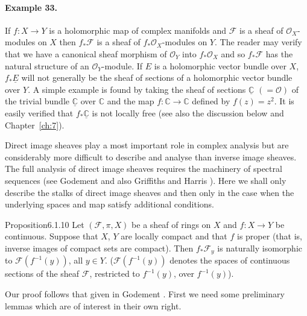 \paragraph{Example 33.}
If $f:X\to Y$ is a holomorphic map of complex manifolds and $\mathcal F$ is a sheaf of $\mathcal O_X$-modules on $X$ then $f_*\mathcal F$ is a sheaf of $f_*\mathcal O_X$-modules on $Y$. The reader may verify that we have a canonical sheaf morphism of $\mathcal O_Y$ into $f_*\mathcal O_X$ and so $f_*\mathcal F$ has the natural structure of an $\mathcal O_Y$-module. If $E$ is a holomorphic vector bundle over $X$, $f_*\underline E$ will not generally be the sheaf of sections of a holomorphic vector bundle over $Y$. A simple example is found by taking the sheaf of sections $\underline{\mathbb C}$ $(=\mathcal O)$ of the trivial bundle $\underline{\mathbb C}$ over $\mathbb C$ and the map $f:\mathbb C\to\mathbb C$ defined by $f(z)=z^2$. It is easily verified that $f_*\underline{\mathbb C}$ is not locally free (see also the discussion below and Chapter~\ref{ch:7}).

Direct image sheaves play a most important role in complex analysis but are considerably more difficult to describe and analyse than inverse image sheaves. The full analysis of direct image sheaves requires the machinery of spectral sequences (see Godement \cite{bib:II:godement-r:1} and also Griffiths and Harris \cite[Chapter 3]{bib:II:griffiths-p-and-harris-j:1}). Here we shall only describe the stalks of direct image sheaves and then only in the case when the underlying spaces and map satisfy additional conditions.
\begin{originaltheorem}{Proposition}{6.1.10}
Let $(\mathcal F,\pi,X)$ be a sheaf of rings on $X$ and $f:X\to Y$ be continuous. Suppose that $X$, $Y$ are locally compact and that $f$ is proper (that is, inverse images of compact sets are compact). Then $f_*\mathcal F_y$ is naturally isomorphic to $\mathcal F(f^{-1}(y))$, all $y\in Y$. ($\mathcal F(f^{-1}(y))$ denotes the spaces of continuous sections of the sheaf $\mathcal F$, restricted to $f^{-1}(y)$, over $f^{-1}(y)$).
\end{originaltheorem}
Our proof follows that given in Godement \cite{bib:II:godement-r:1}. First we need some preliminary lemmas which are of interest in their own right.

